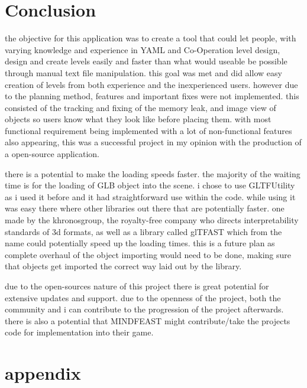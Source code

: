 
\section{Conclusion}
the objective for this application was to create a tool that could let people, with varying knowledge and experience in YAML and Co-Operation level design, design and create levels easily and faster than what would useable be possible through manual text file manipulation. this goal was met and did allow easy creation of levels from both experience and the inexperienced users. however due to the planning  method, features and important fixes were not implemented. this consisted of the tracking and fixing of the memory leak, and image view of objects so users know what they look like before placing them. with most functional requirement being implemented with a lot of non-functional features also appearing, this was a successful project in my opinion with the production of a open-source application. 

there is a potential to make the loading speeds faster. the majority of the waiting time is for the loading of GLB object into the scene. i chose to use GLTFUtility as i used it before and it had straightforward use within the code. while using it was easy there where other libraries out there that are potentially faster. one made by the khronosgroup, the royalty-free company who directs interpretability standards of 3d formats, as well as a library called glTFAST which from the name could potentially speed up the loading times. this is a future plan as complete overhaul of the object importing would need to be done, making sure that objects get imported the correct way laid out by the library.

due to the open-sources nature of this project there is great potential for extensive updates and support. due to the openness of the project, both the community and i can contribute to the progression of the project afterwards. there is also a potential that MINDFEAST might contribute/take the projects code for implementation into their game.

\printbibliography

\section{appendix}

